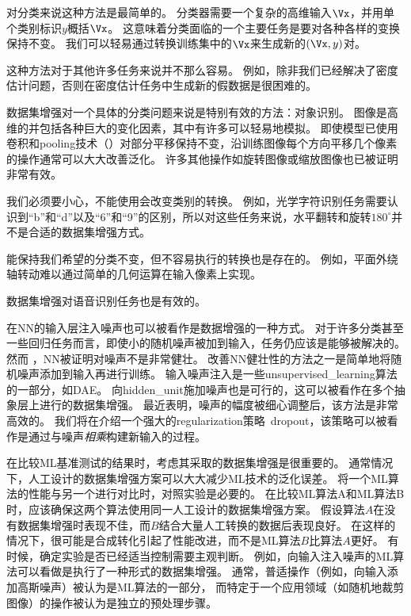 对分类来说这种方法是最简单的。
分类器需要一个复杂的高维输入$\Vx$，并用单个类别标识$y$概括$\Vx$。
这意味着分类面临的一个主要任务是要对各种各样的变换保持不变。
我们可以轻易通过转换训练集中的$\Vx$来生成新的$(\Vx, y)$对。

这种方法对于其他许多任务来说并不那么容易。
例如，除非我们已经解决了密度估计问题，否则在密度估计任务中生成新的假数据是很困难的。

数据集增强对一个具体的分类问题来说是特别有效的方法：对象识别。
图像是高维的并包括各种巨大的变化因素，其中有许多可以轻易地模拟。
即使模型已使用卷积和\gls{pooling}技术（）对部分平移保持不变，沿训练图像每个方向平移几个像素的操作通常可以大大改善泛化。
许多其他操作如旋转图像或缩放图像也已被证明非常有效。

我们必须要小心，不能使用会改变类别的转换。
例如，光学字符识别任务需要认识到``b''和``d''以及``6''和``9''的区别，所以对这些任务来说，水平翻转和旋转$180^{\circ}$并不是合适的数据集增强方式。


能保持我们希望的分类不变，但不容易执行的转换也是存在的。
例如，平面外绕轴转动难以通过简单的几何运算在输入像素上实现。

数据集增强对语音识别任务也是有效的\citep{Jaitly_VTLP_2013}。

在\gls{NN}的输入层注入噪声\citep{SietsmaDow91}也可以被看作是数据增强的一种方式。
对于许多分类甚至一些回归任务而言，即使小的随机噪声被加到输入，任务仍应该是能够被解决的。
然而 ，\gls{NN}被证明对噪声不是非常健壮\citep{TangElias10}。
改善\gls{NN}健壮性的方法之一是简单地将随机噪声添加到输入再进行训练。
输入噪声注入是一些\gls{unsupervised_learning}算法的一部分，如\gls{DAE}\citep{VincentPLarochelleH2008}。
向\gls{hidden_unit}施加噪声也是可行的，这可以被看作在多个抽象层上进行的数据集增强。
\cite{Poole14}最近表明，噪声的幅度被细心调整后，该方法是非常高效的。
我们将在介绍一个强大的\gls{regularization}策略~\gls{dropout}，该策略可以被看作是通过与噪声\emph{相乘}构建新输入的过程。

在比较\gls{ML}基准测试的结果时，考虑其采取的数据集增强是很重要的。
通常情况下，人工设计的数据集增强方案可以大大减少\gls{ML}技术的泛化误差。
将一个\gls{ML}算法的性能与另一个进行对比时，对照实验是必要的。
在比较\gls{ML}算法A和\gls{ML}算法B时，应该确保这两个算法使用同一人工设计的数据集增强方案。
假设算法$A$在没有数据集增强时表现不佳，而$B$结合大量人工转换的数据后表现良好。
在这样的情况下，很可能是合成转化引起了性能改进，而不是\gls{ML}算法$B$比算法$A$更好。 
有时候，确定实验是否已经适当控制需要主观判断。
例如，向输入注入噪声的\gls{ML}算法可以看做是执行了一种形式的数据集增强。
通常，普适操作（例如，向输入添加高斯噪声）被认为是\gls{ML}算法的一部分，
而特定于一个应用领域（如随机地裁剪图像）的操作被认为是独立的预处理步骤。

